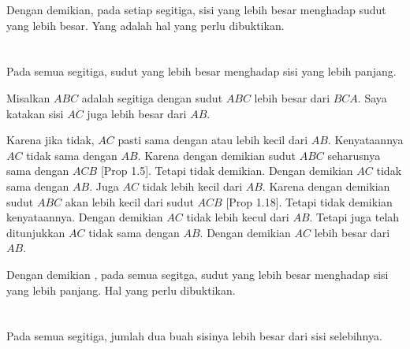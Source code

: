 \documentclass[a4paper]{book}
\begin{document}
Dengan demikian, pada setiap segitiga, sisi yang lebih besar menghadap sudut
yang lebih besar. Yang adalah hal yang perlu dibuktikan.

\section*{\centering \thesection} 
Pada semua segitiga, sudut yang lebih besar menghadap sisi yang lebih panjang.
\begin{center}
\end{center} 

Misalkan $ABC$ adalah segitiga dengan sudut $ABC$ lebih besar dari $BCA$. 
Saya katakan sisi $AC$ juga lebih besar dari $AB$.

Karena jika tidak, $AC$ pasti sama dengan atau lebih kecil dari $AB$. Kenyataannya
$AC$ tidak sama dengan $AB$. Karena dengan demikian sudut $ABC$ seharusnya sama 
dengan $ACB$ [Prop 1.5]. Tetapi tidak demikian. Dengan demikian $AC$ tidak 
sama dengan $AB$. Juga $AC$ tidak lebih kecil dari $AB$. Karena dengan
demikian sudut $ABC$ akan lebih kecil dari sudut $ACB$ [Prop 1.18]. Tetapi
tidak demikian kenyataannya. Dengan demikian $AC$ tidak lebih kecul dari 
$AB$. Tetapi juga telah ditunjukkan $AC$ tidak sama dengan $AB$. Dengan demikian
$AC$ lebih besar dari $AB$.

Dengan demikian , pada semua segitga, sudut yang lebih besar menghadap sisi yang
lebih panjang. Hal yang perlu dibuktikan.

\section*{\centering \thesection}
Pada semua segitiga, jumlah dua buah sisinya lebih besar dari sisi selebihnya.

\begin{center}
\end{center}
\end{document}

